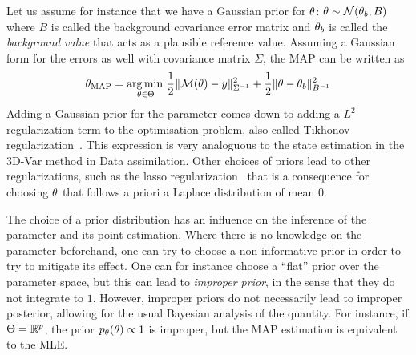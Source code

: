 \documentclass[../../Main_ManuscritThese.tex]{subfiles}
\begin{document}
Let us assume for instance that we have a Gaussian prior for $\theta$:
$\theta \sim \mathcal{N}(\theta_{b},B)$ where $B$ is called the
background covariance error matrix and $\theta_b$ is called the
\emph{background value} that acts as a plausible reference
value. Assuming a Gaussian form for the errors as well with covariance
matrix $\Sigma$, the MAP can be written as
\begin{equation}
  {\theta}_{\mathrm{MAP}} = \operatorname*{arg\,min \,}_{\theta \in \Theta} \frac{1}{2}\| \mathcal{M}(\theta) - y\|^2_{\Sigma^{-1}} + \frac{1}{2}\|\theta - \theta_b\|^2_{B^{-1}}
\end{equation}
Adding a Gaussian prior for the parameter comes down to adding a $L^2$
regularization term to the optimisation problem, also called Tikhonov
regularization~\cite{tikhonov_solutions_1977}. This expression is very
analoguous to the state estimation in the 3D-Var method in Data
assimilation.  Other choices of priors lead to other regularizations,
such as the lasso regularization~\cite{tibshirani_regression_2011}
that is a consequence for choosing $\theta$ that follows a priori a
Laplace distribution of mean $0$.

The choice of a prior distribution has an influence on the inference
of the parameter and its point estimation. Where there is no knowledge
on the parameter beforehand, one can try to choose a non-informative
prior in order to try to mitigate its effect. One can for instance
choose a ``flat'' prior over the parameter space, but this can lead to
\emph{improper prior}, in the sense that they do not integrate to
$1$. However, improper priors do not necessarily lead to improper
posterior, allowing for the usual Bayesian analysis of the
quantity. For instance, if $\Theta=\mathbb{R}^p$, the prior
$p_{\theta}(\theta) \propto 1$ is improper, but the MAP estimation is
equivalent to the MLE.

\end{document}
